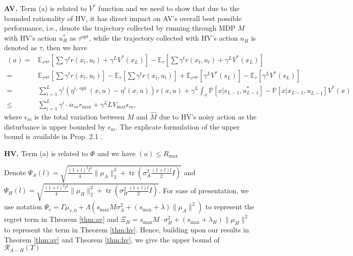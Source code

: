 {\bf AV.} Term (a) is related to $V^{*}$ function and we need to show that due to the bounded rationality of HV, it has direct impact on AV's overall best possible performance, i.e., denote the trajectory collected by running through MDP $M$ with HV's action $u_H^{*}$ as  $\tau^{\operatorname{opt}}$, while the trajectory collected with HV's action $u_H^{}$ is denoted as $\tau$, then we have
    \begin{align*}
        (a) =&\mathbb{E}_{\tau^{\operatorname{opt}}}\left[\sum \gamma^t r\left(x_t, u_t\right)+\gamma^L {V}^{*}\left(x_L\right)\right] - \mathbb{E}_{\tau^{}}\left[\sum \gamma^t r\left(x_t, u_t\right)+\gamma^L {V}^{*}\left(x_L\right)\right]\\
     =& \mathbb{E}_{\tau^{\operatorname{opt}}}\left[\sum \gamma^t r\left(x_t, u_t\right)\right] - \mathbb{E}_{\tau^{}}\left[\sum \gamma^t r\left(x_t, u_t\right)\right] + \mathbb{E}_{\tau^{\operatorname{opt}}}\left[\gamma^L {V}^{*}\left(s_L\right)\right] - \mathbb{E}_{\tau^{}}\left[\gamma^L {V}^{*}\left(s_L\right)\right]\\
     =& \sum_{i=1}^L \gamma^i \left( \eta^{i,\operatorname{opt}}(x,u) - \eta^i(x,u)  \right) r(x,u) + \gamma^L \int_x \mathbb{P} [{x \vert s_{L-1},u^{*}_{L-1} }]-\mathbb{P} [{x \vert x_{L-1},u^{}_{L-1} }]V^{*}(x)\\
     \leq & \sum_{i=1}^L \gamma^i \cdot i \epsilon_m r_{\max} + \gamma^L L V_{\max }\epsilon_m,
    \end{align*}
    where $\epsilon_m$ is the total variation between $M$ and $\hat{M}$ due to HV's noisy action as the disturbance is upper bounded by $\epsilon_m$. The explicate formulation of the upper bound is available in Prop. 2.1 \cite{devroye2018total}.


{\bf HV.} Term (a) is related to $\Phi^{}$ and we have $ (a) \leq R_{\max} $

Denote $ \scriptstyle\Psi_A(l) = \sqrt{\frac{(1+l)^2l^2}{4}\|\mu_A\|^2_2 + \operatorname{tr}\left( \sigma_A^2 \frac{(1+l)l}{2}I \right)}$ and $\scriptstyle \Psi_H(l) = \sqrt{\frac{(1+l)^2l^2}{4}\|\mu_H\|^2_2 + \operatorname{tr}\left( \sigma_H^2 \frac{(1+l)l}{2}I \right)}$. For ease of presentation, we use notation $\textstyle\Psi_v=\Gamma \mu_{v,0} + \Lambda (s_{\max}M\sigma_A^2 + (s_{\max} + \lambda)\|\mu_A\|^2)$ to represent the regret term in Theorem \ref{thm:av} and $\Xi_H=s_{\max}M \cdot \sigma_H^2 + (s_{\max}+\lambda_H) \|\mu_H\|^2$ to represent the term in Theorem \ref{thm:hv}. Hence, building upon our results in Theorem \ref{thm:av}  and Theorem \ref{thm:hv}, we give the upper bound of  $\mathcal{R}_{A-H}(T)$ 

